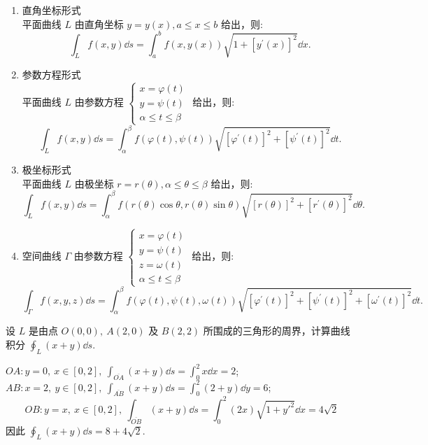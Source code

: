 \begin{theorem}[第一类曲线积分化为定积分]
    \begin{enumerate}[label=(\arabic{*})]
        \item 直角坐标形式\\
              平面曲线 $ L $ 由直角坐标 $ y=y(x), a \leqslant x \leqslant b $ 给出，则:
              $$\int_{L} f(x, y) \dd  s=\int_{a}^{b} f(x, y(x)) \sqrt{1+\left[y^{\prime}(x)\right]^{2}} \dd  x .$$
        \item 参数方程形式\\
              平面曲线 $ L $ 由参数方程 $ \begin{cases}
                      x=\varphi(t) \\ y=\psi(t)\\\alpha \leqslant t \leqslant \beta
                  \end{cases} $ 给出，则:
              $$\int_{L} f(x, y) \dd  s=\int_{\alpha}^{\beta} f(\varphi(t), \psi(t)) \sqrt{\left[\varphi^{\prime}(t)\right]^{2}+\left[\psi^{\prime}(t)\right]^{2}} \dd  t .$$
        \item 极坐标形式\\
              平面曲线 $ L $ 由极坐标 $ r=r(\theta), \alpha \leqslant \theta \leqslant \beta $ 给出，则:
              $$\int_{L} f(x, y) \dd  s=\int_{\alpha}^{\beta} f(r(\theta) \cos \theta, r(\theta) \sin \theta) \sqrt{[r(\theta)]^{2}+\left[r^{\prime}(\theta)\right]^{2}} \dd  \theta .$$
        \item 空间曲线 $\Gamma $ 由参数方程 $\begin{cases}
                      x=\varphi(t) \\ y=\psi(t)\\ z=\omega(t)\\\alpha \leqslant t \leqslant \beta
                  \end{cases}$ 给出，则:
              $$\int_{\Gamma} f(x, y, z) \dd  s =\int_{\alpha}^{\beta} f(\varphi(t), \psi(t), \omega(t))\sqrt{\left[\varphi^{\prime}(t)\right]^{2}+\left[\psi^{\prime}(t)\right]^{2}+\left[\omega^{\prime}(t)\right]^{2}} \dd  t .$$
    \end{enumerate}
\end{theorem}

\begin{example}
    设 $L$ 是由点 $O(0,0),~A(2,0)$ 及 $B(2,2)$ 所围成的三角形的周界，计算曲线积分 $\displaystyle\oint_L(x+y)\dd s.$
\end{example}
\begin{solution}
    $OA: y=0,~x\in[0,2],~\displaystyle\int_{\overline{OA}}(x+y)\dd s=\int_{0}^{2}x\dd x=2$; $\displaystyle AB: x=2,~y\in[0,2],~\int_{\overline{AB}}(x+y)\dd s=\int_{0}^{2}(2+y)\dd y=6$;
    $$OB: y=x,~x\in[0,2],~\int_{\overline{OB}}(x+y)\dd s=\int_{0}^{2}(2x)\sqrt{1+y'^2}\dd x=4\sqrt{2}$$
    因此 $\displaystyle\oint_L (x+y)\dd s=8+4\sqrt{2}.$
\end{solution}

